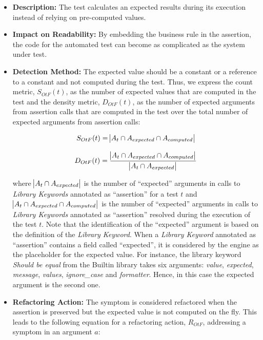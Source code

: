 \begin{itemize}
    \item \textbf{Description:} The test calculates an expected results during its execution instead of relying on pre-computed values.

    \item \textbf{Impact on Readability:} By embedding the business rule in the assertion, the code for the automated test can become as complicated as the system under test.
    
    \item \textbf{Detection Method:} The expected value should be a constant or a reference to a constant and not computed during the test. Thus, we express the count metric, $S_{OtF}(t)$, as the number of expected values that are computed in the test and the density metric, $D_{OtF}(t)$, as the number of expected arguments from assertion calls that are computed in the test over the total number of expected arguments from assertion calls:
    
    \begin{equation*}
        S_{OtF}(t) = \abs{A_{t} \cap A_{expected} \cap A_{computed}}
    \end{equation*}
    
    \begin{equation*}
        D_{OtF}(t) = \frac{\abs{A_{t} \cap A_{expected} \cap A_{computed}}}{\abs{A_{t} \cap A_{expected}}}
    \end{equation*}
    
    where $\abs{A_{t} \cap A_{expected}}$ is the number of ``expected'' arguments in calls to \emph{Library Keywords} annotated as ``assertion'' for a test $t$ and  $\abs{A_{t} \cap A_{expected} \cap A_{computed}}$ is the number of ``expected'' arguments in calls to \emph{Library Keywords} annotated as ``assertion'' resolved during the execution of the test $t$. Note that the identification of the ``expected'' argument is based on the definition of the \emph{Library Keyword}. When a \emph{Library Keyword} annotated as ``assertion'' contains a field called ``expected'', it is considered by the engine as the placeholder for the expected value. For instance, the library keyword \emph{Should be equal} from the Builtin library takes six arguments: \emph{value}, \emph{expected}, \emph{message}, \emph{values}, \emph{ignore\_case} and \emph{formatter}. Hence, in this case the expected argument is the second one.
    
    \item \textbf{Refactoring Action:} The symptom is considered refactored when the assertion is preserved but the expected value is not computed on the fly. This leads to the following equation for a refactoring action, $R_{OtF}$, addressing a symptom in an argument $a$:
    

\end{itemize}
